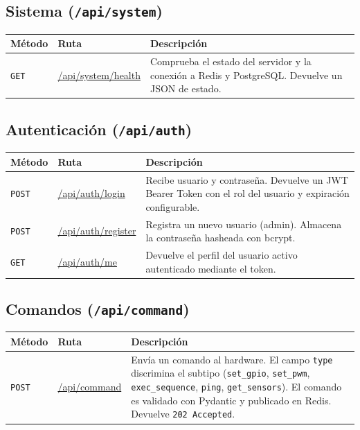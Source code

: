 \subsection{Sistema (\texttt{/api/system})}
\begin{table}[H]
    \centering
    \begin{tabularx}{\textwidth}{llX}
        \toprule
        \textbf{Método} & \textbf{Ruta}   & \textbf{Descripción} \\
        \midrule
        \texttt{GET}  & \url{/api/system/health} & Comprueba el estado del servidor y la conexión a Redis y PostgreSQL. Devuelve un JSON de estado. \\
        \bottomrule
    \end{tabularx}
\end{table}

\subsection{Autenticación (\texttt{/api/auth})}
\begin{table}[H]
    \centering
    \begin{tabularx}{\textwidth}{llX}
        \toprule
        \textbf{Método} & \textbf{Ruta}             & \textbf{Descripción} \\
        \midrule
        \texttt{POST} & \url{/api/auth/login}    & Recibe usuario y contraseña. Devuelve un JWT Bearer Token con el rol del usuario y expiración configurable. \\
        \texttt{POST} & \url{/api/auth/register} & Registra un nuevo usuario (admin). Almacena la contraseña hasheada con bcrypt. \\
        \texttt{GET}  & \url{/api/auth/me}       & Devuelve el perfil del usuario activo autenticado mediante el token. \\
        \bottomrule
    \end{tabularx}
\end{table}

\subsection{Comandos (\texttt{/api/command})}
\begin{table}[H]
    \centering
    \begin{tabularx}{\textwidth}{llX}
        \toprule
        \textbf{Método} & \textbf{Ruta}          & \textbf{Descripción} \\
        \midrule
        \texttt{POST} & \url{/api/command}    & Envía un comando al hardware. El campo \texttt{type} discrimina el subtipo (\texttt{set\_gpio}, \texttt{set\_pwm}, \texttt{exec\_sequence}, \texttt{ping}, \texttt{get\_sensors}). El comando es validado con Pydantic y publicado en Redis. Devuelve \texttt{202 Accepted}. \\
        \bottomrule
    \end{tabularx}
\end{table}

